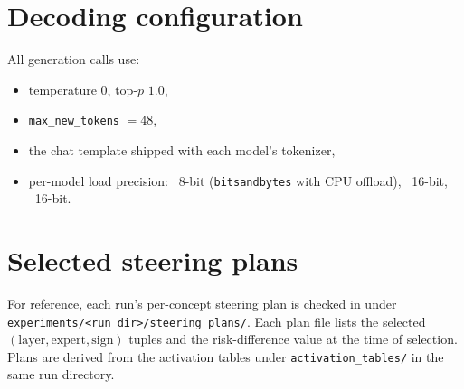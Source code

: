 \section{Decoding configuration}
\label{app:decoding}

All generation calls use:

\begin{itemize}
  \item temperature $0$, top-$p$ $1.0$,
  \item \texttt{max\_new\_tokens} $= 48$,
  \item the chat template shipped with each model's tokenizer,
  \item per-model load precision: \mixtral~8-bit (\texttt{bitsandbytes}
  with CPU offload), \llama~16-bit, \olmoe~16-bit.
\end{itemize}

\section{Selected steering plans}
\label{app:plans}

For reference, each run's per-concept steering plan is checked in under
\texttt{experiments/<run\_dir>/steering\_plans/}. Each plan file lists
the selected $(\text{layer}, \text{expert}, \text{sign})$ tuples and the
risk-difference value at the time of selection. Plans are derived from
the activation tables under \texttt{activation\_tables/} in the same
run directory.
